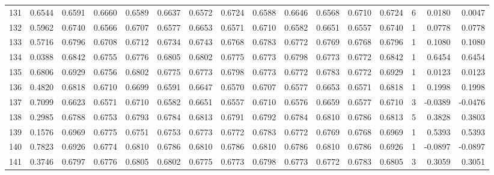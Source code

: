 \begin{tabular}{lrrrrrrrrrrrrrrr}
131 &      0.6544 &  0.6591 &  0.6660 &  0.6589 &  0.6637 &  0.6572 &  0.6724 &  0.6588 &  0.6646 &  0.6568 &   0.6710 &     0.6724 &      6 &                    0.0180 &                     0.0047 \\
132 &      0.5962 &  0.6740 &  0.6566 &  0.6707 &  0.6577 &  0.6653 &  0.6571 &  0.6710 &  0.6582 &  0.6651 &   0.6557 &     0.6740 &      1 &                    0.0778 &                     0.0778 \\
133 &      0.5716 &  0.6796 &  0.6708 &  0.6712 &  0.6734 &  0.6743 &  0.6768 &  0.6783 &  0.6772 &  0.6769 &   0.6768 &     0.6796 &      1 &                    0.1080 &                     0.1080 \\
134 &      0.0388 &  0.6842 &  0.6755 &  0.6776 &  0.6805 &  0.6802 &  0.6775 &  0.6773 &  0.6798 &  0.6773 &   0.6772 &     0.6842 &      1 &                    0.6454 &                     0.6454 \\
135 &      0.6806 &  0.6929 &  0.6756 &  0.6802 &  0.6775 &  0.6773 &  0.6798 &  0.6773 &  0.6772 &  0.6783 &   0.6772 &     0.6929 &      1 &                    0.0123 &                     0.0123 \\
136 &      0.4820 &  0.6818 &  0.6710 &  0.6699 &  0.6591 &  0.6647 &  0.6570 &  0.6707 &  0.6577 &  0.6653 &   0.6571 &     0.6818 &      1 &                    0.1998 &                     0.1998 \\
137 &      0.7099 &  0.6623 &  0.6571 &  0.6710 &  0.6582 &  0.6651 &  0.6557 &  0.6710 &  0.6576 &  0.6659 &   0.6577 &     0.6710 &      3 &                   -0.0389 &                    -0.0476 \\
138 &      0.2985 &  0.6788 &  0.6753 &  0.6793 &  0.6784 &  0.6813 &  0.6791 &  0.6792 &  0.6784 &  0.6810 &   0.6786 &     0.6813 &      5 &                    0.3828 &                     0.3803 \\
139 &      0.1576 &  0.6969 &  0.6775 &  0.6751 &  0.6753 &  0.6773 &  0.6772 &  0.6783 &  0.6772 &  0.6769 &   0.6768 &     0.6969 &      1 &                    0.5393 &                     0.5393 \\
140 &      0.7823 &  0.6926 &  0.6774 &  0.6810 &  0.6786 &  0.6810 &  0.6786 &  0.6810 &  0.6786 &  0.6810 &   0.6786 &     0.6926 &      1 &                   -0.0897 &                    -0.0897 \\
141 &      0.3746 &  0.6797 &  0.6776 &  0.6805 &  0.6802 &  0.6775 &  0.6773 &  0.6798 &  0.6773 &  0.6772 &   0.6783 &     0.6805 &      3 &                    0.3059 &                     0.3051 \\

\end{tabular}
